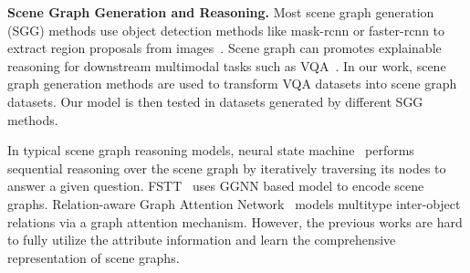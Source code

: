 \documentclass[letterpaper]{article} %
\begin{document}
\vspace{0.05in}
\noindent\textbf{Scene Graph Generation and Reasoning.}
Most scene graph generation (SGG) methods use object detection methods like mask-rcnn or faster-rcnn to extract region proposals from images~\cite{DBLP:conf/cvpr/XuZCF17,DBLP:conf/eccv/YangLLBP18,DBLP:conf/cvpr/ZellersYTC18,DBLP:conf/nips/WooKCK18,DBLP:conf/cvpr/DaiZL17,DBLP:conf/iccv/LiOZWW17,DBLP:conf/eccv/YinSLYWSL18,DBLP:conf/cvpr/TangNHSZ20}. 
Scene graph can promotes explainable reasoning for downstream multimodal tasks such as VQA~\cite{DBLP:conf/bmvc/ZhangCX19}. In our work, scene graph generation methods are used to transform VQA datasets into scene graph datasets. Our model is then tested in datasets generated by different SGG methods.

In typical scene graph reasoning models, neural state machine~\cite{DBLP:conf/nips/HudsonM19} 
performs sequential reasoning over the scene graph by iteratively traversing its nodes to answer a given question.
FSTT~\cite{inproceedings} uses GGNN based model to encode scene graphs.
Relation-aware Graph Attention Network~\cite{DBLP:conf/iccv/LiGCL19} models multitype inter-object relations via a graph attention mechanism.
However, the previous works are hard to fully utilize the attribute information and learn the comprehensive representation of scene graphs.
\end{document}
